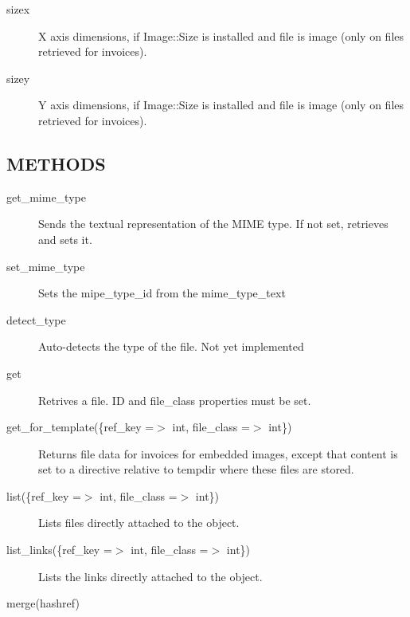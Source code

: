 \begin{description}
\begin{description}
\begin{description}
\begin{description}
\begin{description}
\begin{description}
\begin{description}
\item[{sizex}] \mbox{}

X axis dimensions, if Image::Size is installed and file is image (only on files
retrieved for invoices).


\item[{sizey}] \mbox{}

Y axis dimensions, if Image::Size is installed and file is image (only on files
retrieved for invoices).

\end{description}
\subsection*{METHODS\label{LedgerSMB::File_METHODS}}
\begin{description}

\item[{get\_mime\_type}] \mbox{}

Sends the textual representation of the MIME type.  If not set, retrieves and
sets it.


\item[{set\_mime\_type}] \mbox{}

Sets the mipe\_type\_id from the mime\_type\_text


\item[{detect\_type}] \mbox{}

Auto-detects the type of the file.  Not yet implemented


\item[{get}] \mbox{}

Retrives a file.  ID and file\_class properties must be set.


\item[{get\_for\_template(\{ref\_key =$>$ int, file\_class =$>$ int\})}] \mbox{}

Returns file data for invoices for embedded images, except that content is set
to a directive relative to tempdir where these files are stored.


\item[{list(\{ref\_key =$>$ int, file\_class =$>$ int\})}] \mbox{}

Lists files directly attached to the object.


\item[{list\_links(\{ref\_key =$>$ int, file\_class =$>$ int\})}] \mbox{}

Lists the links directly attached to the object.


\item[{merge(hashref)}] \mbox{}


\end{description}
\end{description}
\end{description}
\end{description}
\end{description}
\end{description}
\end{description}

